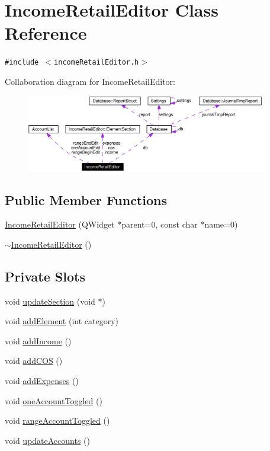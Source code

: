 \hypertarget{classIncomeRetailEditor}{
\section{Income\-Retail\-Editor Class Reference}
\label{classIncomeRetailEditor}
}
{\tt \#include $<$income\-Retail\-Editor.h$>$}

Collaboration diagram for Income\-Retail\-Editor:\begin{figure}[H]
\begin{center}
\leavevmode
\includegraphics[width=300pt]{classIncomeRetailEditor__coll__graph}
\end{center}
\end{figure}
\subsection*{Public Member Functions}
\begin{CompactItemize}
\item 
\hyperlink{classIncomeRetailEditor_a0}{Income\-Retail\-Editor} (QWidget $\ast$parent=0, const char $\ast$name=0)
\item 
\hyperlink{classIncomeRetailEditor_a1}{$\sim$Income\-Retail\-Editor} ()
\end{CompactItemize}
\subsection*{Private Slots}
\begin{CompactItemize}
\item 
void \hyperlink{classIncomeRetailEditor_k0}{update\-Section} (void $\ast$)
\item 
void \hyperlink{classIncomeRetailEditor_k1}{add\-Element} (int category)
\item 
void \hyperlink{classIncomeRetailEditor_k2}{add\-Income} ()
\item 
void \hyperlink{classIncomeRetailEditor_k3}{add\-COS} ()
\item 
void \hyperlink{classIncomeRetailEditor_k4}{add\-Expenses} ()
\item 
void \hyperlink{classIncomeRetailEditor_k5}{one\-Account\-Toggled} ()
\item 
void \hyperlink{classIncomeRetailEditor_k6}{range\-Account\-Toggled} ()
\item 
void \hyperlink{classIncomeRetailEditor_k7}{update\-Accounts} ()
\end{CompactItemize}

